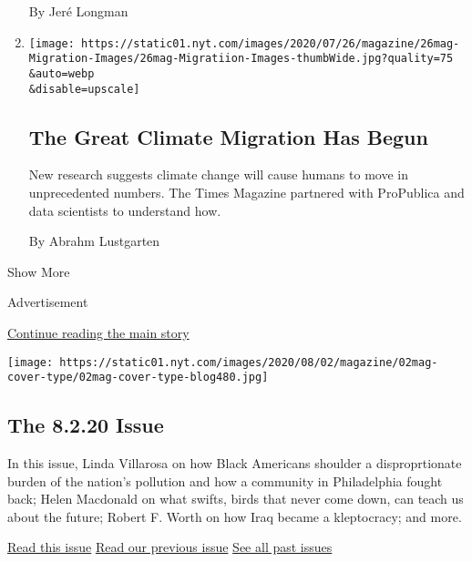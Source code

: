 \begin{enumerate}
  By Jeré Longman
\item
  \href{/interactive/2020/07/23/magazine/climate-migration.html}{}

  \texttt{[image: https://static01.nyt.com/images/2020/07/26/magazine/26mag-Migration-Images/26mag-Migratiion-Images-thumbWide.jpg?quality=75\\\&auto=webp\\\&disable=upscale]}

  \hypertarget{the-great-climate-migration-has-begun}{%
  \subsection{The Great Climate Migration Has
  Begun}\label{the-great-climate-migration-has-begun}}

  New research suggests climate change will cause humans to move in
  unprecedented numbers. The Times Magazine partnered with ProPublica
  and data scientists to understand how.

  By Abrahm Lustgarten
\end{enumerate}

Show More

Advertisement

\protect\hyperlink{after-mid2}{Continue reading the main story}

\href{https://www.nytimes.com/issue/magazine/2020/07/31/the-8220-issue}{}

\texttt{[image: https://static01.nyt.com/images/2020/08/02/magazine/02mag-cover-type/02mag-cover-type-blog480.jpg]}

\href{https://www.nytimes.com/issue/magazine/2020/07/31/the-8220-issue}{}

\hypertarget{the-8220-issue}{%
\subsection{The 8.2.20 Issue}\label{the-8220-issue}}

In this issue, Linda Villarosa on how Black Americans shoulder a
disproprtionate burden of the nation's pollution and how a community in
Philadelphia fought back; Helen Macdonald on what swifts, birds that
never come down, can teach us about the future; Robert F. Worth on how
Iraq became a kleptocracy; and more.

\href{https://www.nytimes.com/issue/magazine/2020/07/31/the-8220-issue}{Read
this issue}
\href{https://www.nytimes.com/issue/magazine/2020/07/24/the-72620-issue}{Read
our previous issue}
\href{https://www.nytimes.com/interactive/2020/07/02/magazine/past-issues-sunday-magazine.html}{See
all past issues}

